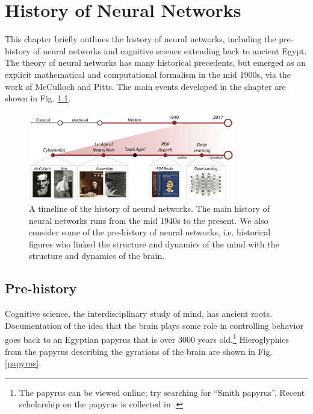 \chapter{History of Neural Networks}\label{ch_history}


This chapter briefly outlines the history of neural networks, including the pre-history of neural networks and cognitive science extending back to ancient Egypt. The theory of neural networks has many historical precedents, but emerged as an explicit mathematical and computational formalism in the mid 1900s, via the work of McCulloch and Pitts. The main events developed in the chapter are shown in Fig. \ref{timelineHistory}. 

\begin{figure}[h]
\centering
\includegraphics[width=0.8\textwidth]{images/historyTimeline.png}
\caption[Pamela Payne and Jeff Yoshimi.]{A timeline of the history of neural networks. The main history of neural networks runs from the mid 1940s to the present. We  also consider some of the pre-history of neural networks,  i.e. historical figures who linked the structure and dynamics of the mind with the structure and dynamics of the brain.}
\label{timelineHistory}
\end{figure}

\section{Pre-history}

Cognitive science, the interdisciplinary study of mind, has ancient roots. Documentation of the idea that the brain plays some role in controlling behavior goes back to an Egyptian papyrus that is over 3000 years old.\footnote{The papyrus can be viewed online; try searching for ``Smith papyrus''. Recent scholarship on the papyrus is collected in \cite{meltzer2014edwin}.} Hieroglyphics from the papyrus describing the gyrations of the brain are shown in Fig. \ref{papyrus}. 

